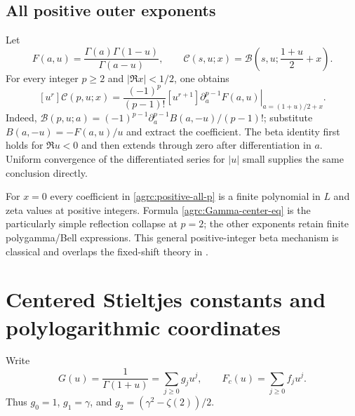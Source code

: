\documentclass[11pt]{article}
\numberwithin{equation}{section}
\theoremstyle{definition}\newtheorem{definition}[theorem]{Definition}
\theoremstyle{remark}\newtheorem{remark}[theorem]{Remark}
\newcommand{\Bcal}{\mathcal B}
\newcommand{\Ccal}{\mathcal C}
\begin{document}
\subsection{All positive outer exponents}

Let
\[
 F(a,u)=\frac{\Gamma(a)\Gamma(1-u)}{\Gamma(a-u)},
 \qquad \Ccal(s,u;x)=\Bcal\left(s,u;\frac{1+u}{2}+x\right).
\]
For every integer $p\geq2$ and $|\Re x|<1/2$, one obtains
\begin{equation}\label{agrc:positive-all-p}
 [u^r]\Ccal(p,u;x)=
 \frac{(-1)^p}{(p-1)!}[u^{r+1}]
  \left.\partial_a^{p-1}F(a,u)\right|_{a=(1+u)/2+x}.
\end{equation}
Indeed,
$\Bcal(p,u;a)=(-1)^{p-1}\partial_a^{p-1}B(a,-u)/(p-1)!$;
substitute $B(a,-u)=-F(a,u)/u$ and extract the coefficient.
The beta identity first holds for $\Re u<0$ and then extends through
zero after differentiation in $a$. Uniform convergence of the differentiated
series for $|u|$ small supplies the same conclusion directly.

For $x=0$ every coefficient in \eqref{agrc:positive-all-p} is a finite
polynomial in $L$ and zeta values at positive integers. Formula
\eqref{agrc:Gamma-center-eq} is the particularly simple reflection
collapse at $p=2$; the other exponents retain finite polygamma/Bell
expressions. This general positive-integer beta mechanism is classical
and overlaps the fixed-shift theory in \cite{repo-laurent}.

\section{Centered Stieltjes constants and polylogarithmic coordinates}
\label{agrc:center-Stieltjes-section}

Write
\begin{equation}\label{agrc:Gf}
 G(u)=\frac1{\Gamma(1+u)}=\sum_{j\geq0}g_ju^j,
 \qquad F_c(u)=\sum_{j\geq0}f_ju^j.
\end{equation}
Thus $g_0=1$, $g_1=\gamma$, and
$g_2=(\gamma^2-\zeta(2))/2$.
\end{document}
